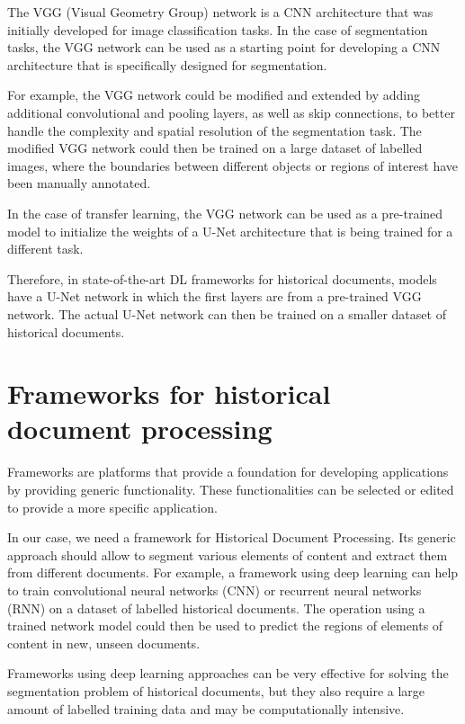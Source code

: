 \documentclass{polytech/polytech}
\numberwithin{figure}{chapter}
\begin{document}
The VGG (Visual Geometry Group) network is a CNN architecture that was initially developed for image classification tasks.
In the case of segmentation tasks, the VGG network can be used as a starting point for developing a CNN architecture that is specifically designed for segmentation.

For example, the VGG network could be modified and extended by adding additional convolutional and pooling layers, as well as skip connections, to better handle the complexity and spatial resolution of the segmentation task.
The modified VGG network could then be trained on a large dataset of labelled images, where the boundaries between different objects or regions of interest have been manually annotated.

In the case of transfer learning, the VGG network can be used as a pre-trained model to initialize the weights of a U-Net architecture that is being trained for a different task.

Therefore, in state-of-the-art DL frameworks for historical documents, models have a U-Net network in which the first layers are from a pre-trained VGG network.
The actual U-Net network can then be trained on a smaller dataset of historical documents.


\section{Frameworks for historical document processing}

Frameworks are platforms that provide a foundation for developing applications by providing generic functionality.
These functionalities can be selected or edited to provide a more specific application.

In our case, we need a framework for Historical Document Processing.
Its generic approach should allow to segment various elements of content and extract them from different documents.
For example, a framework using deep learning can help to train convolutional neural networks (CNN) or recurrent neural networks (RNN) on a dataset of labelled historical documents.
The operation using a trained network model could then be used to predict the regions of elements of content in new, unseen documents.

Frameworks using deep learning approaches can be very effective for solving the segmentation problem of historical documents, but they also require a large amount of labelled training data and may be computationally intensive.
\end{document}

